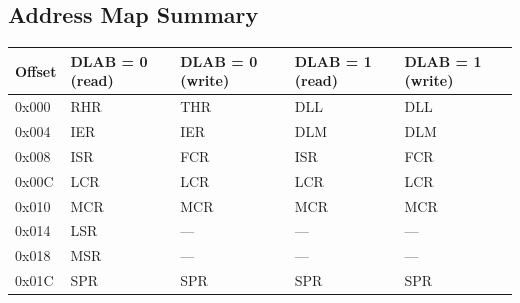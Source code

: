 \subsection{Address Map Summary}

\begin{tabular}{@{}lllll@{}}
\toprule
\textbf{Offset} & \textbf{DLAB = 0 (read)} & \textbf{DLAB = 0 (write)} &
\textbf{DLAB = 1 (read)} & \textbf{DLAB = 1 (write)} \\
\midrule
0x000 & RHR & THR & DLL & DLL \\
0x004 & IER & IER & DLM & DLM \\
0x008 & ISR & FCR & ISR & FCR \\
0x00C & LCR & LCR & LCR & LCR \\
0x010 & MCR & MCR & MCR & MCR \\
0x014 & LSR & --- & --- & --- \\
0x018 & MSR & --- & --- & --- \\
0x01C & SPR & SPR & SPR & SPR \\
\bottomrule
\end{tabular}

\newpage
